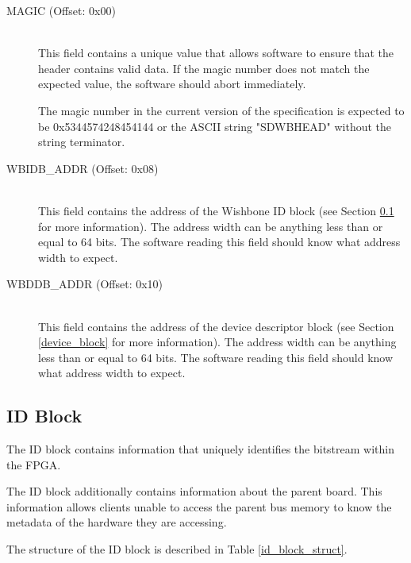 \documentclass{article}
\begin{document}
\begin{description}
\item[MAGIC (Offset: 0x00)] \hfill \\
This field contains a unique value that allows software to ensure that
the header contains valid data. If the magic number does not match the
expected value, the software should abort immediately.

The magic number in the current version of the specification is expected to
be 0x5344574248454144 or the ASCII string "SDWBHEAD" without the string
terminator.

\item[WBIDB\_ADDR (Offset: 0x08)] \hfill \\
This field contains the address of the Wishbone ID block (see Section \ref{id_block}
for more information). The address width can be anything less than or equal
to 64 bits. The software reading this field should know what address width to
expect.

\item[WBDDB\_ADDR (Offset: 0x10)] \hfill \\
This field contains the address of the device descriptor block (see Section
\ref{device_block} for more information). The address width can be anything
less than or equal to 64 bits. The software reading this field should know
what address width to expect.
\end{description}

\subsection{ID Block}\label{id_block}

The ID block contains information that uniquely identifies the bitstream
within the FPGA.

The ID block additionally contains information about the parent board.
This information allows clients unable to access the parent bus memory
to know the metadata of the hardware they are accessing.

The structure of the ID block is described in Table \ref{id_block_struct}.
\end{document}
